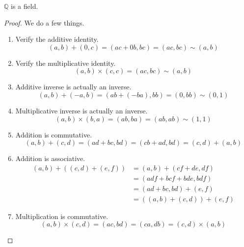     \begin{theorem}
      $\mathbb{Q}$ is a field. 
    \end{theorem} 
    \begin{proof}
      We do a few things. 
      \begin{enumerate}
        \item Verify the additive identity. 
        \begin{equation}
          (a, b) + (0, c) = (ac + 0b, bc) = (ac, bc) \sim (a, b)
        \end{equation}
        \item Verify the multiplicative identity. 
        \begin{equation}
          (a, b) \times (c, c) = (ac, bc) \sim (a, b)
        \end{equation}
        \item Additive inverse is actually an inverse. 
        \begin{equation}
          (a, b) + (-a, b) = (ab + (-ba), bb) = (0, bb) \sim (0, 1)
        \end{equation}
        \item Multiplicative inverse is actually an inverse. 
        \begin{equation}
          (a, b) \times (b, a) = (ab, ba) = (ab, ab) \sim (1, 1)
        \end{equation}
        \item Addition is commutative. 
        \begin{equation}
          (a, b) + (c, d) = (ad + bc, bd) = (cb + ad, bd) = (c, d) + (a, b)
        \end{equation}
        \item Addition is associative. 
        \begin{align}
          (a, b) + ((c, d) + (e, f)) & = (a, b) + (cf + de, df) \\
                                     & = (adf + bcf + bde, bdf) \\
                                     & = (ad + bc, bd) + (e, f) \\
                                     & = ((a, b) + (c, d)) + (e, f)
        \end{align}
        \item Multiplication is commutative. 
        \begin{equation}
          (a, b) \times (c, d) = (ac, bd) = (ca, db) = (c, d) \times (a, b)
        \end{equation}

\end{enumerate}
\end{proof}
